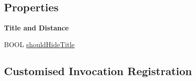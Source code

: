 \subsection*{Properties}
\begin{Indent}\textbf{ Title and Distance}\par
{\em 

 

 }\begin{DoxyCompactItemize}
\item 
B\+O\+OL \mbox{\hyperlink{category_u_i_view_07_i_q_toolbar_addition_08_a855865f7d2ace4051225f4c0d86a74a3}{should\+Hide\+Title}}
\end{DoxyCompactItemize}
\end{Indent}
\subsection*{Customised Invocation Registration}
\label{_amgrp47472c25779af0ea8b948e5c09b5f93a}%


 

